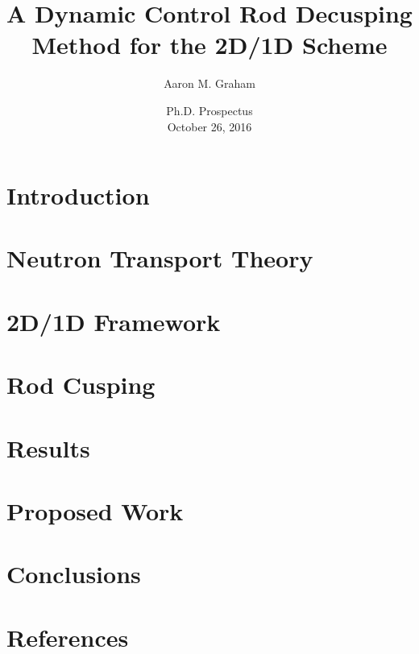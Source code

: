 \documentclass{beamer}
\title[2D/1D Control Rod Decusping]{A Dynamic Control Rod Decusping Method for the 2D/1D Scheme}
\author{Aaron M. Graham}
\date{Ph.D. Prospectus\\October 26, 2016}
\begin{document}
\begin{frame}[t]
    \titlepage
\end{frame}

\begin{frame}[t]
    \tableofcontents[hideallsubsections]
\end{frame}

\section{Introduction}


\section{Neutron Transport Theory}


\section{2D/1D Framework}


\section{Rod Cusping}


\section{Results}


\section{Proposed Work}


\section{Conclusions}


\section{References}
\renewcommand{\bibname}{References}


\end{document}
